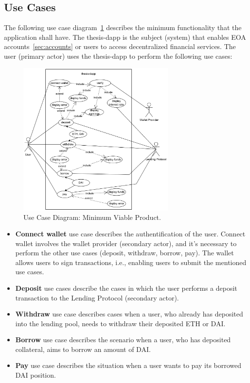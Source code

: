 \documentclass[11pt,a4paper]{report}
\begin{document}
\subsection{Use Cases}
The following use case diagram~\ref{fig:usecase-mvp} describes the minimum functionality that the application shall have. The thesis-dapp is the subject (system) that enables EOA accounts~\ref{sec:accounts} or users to access decentralized financial services. The user (primary actor) uses the thesis-dapp to perform the following use cases:
\begin{figure}[htp]
	\centering
	\includegraphics[width=0.7\textwidth]{./images/USECASE-full_nofl1}
	\caption{Use Case Diagram: Minimum Viable Product.}
	\label{fig:usecase-mvp}
\end{figure}
\begin{itemize}
	\item \textbf{Connect wallet} use case describes the authentification of the user. Connect wallet involves the wallet provider (secondary actor), and it's necessary to perform the other use cases (deposit, withdraw, borrow, pay). The wallet allows users to sign transactions, i.e., enabling users to submit the mentioned use cases.
	\item \textbf{Deposit} use cases describe the cases in which the user performs a deposit transaction to the Lending Protocol (secondary actor). 
	\item \textbf{Withdraw} use case describes cases when a user, who already has deposited into the lending pool, needs to withdraw their deposited ETH or DAI.
	\item \textbf{Borrow} use case describes the scenario when a user, who has deposited collateral, aims to borrow an amount of DAI.
	\item \textbf{Pay} use case describes the situation when a user wants to pay its borrowed DAI position.
\end{itemize}
\end{document}
